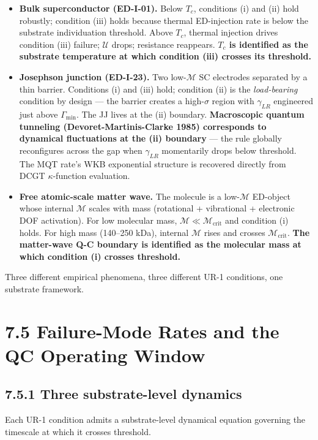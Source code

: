 \documentclass[11pt]{book}
\begin{document}
\begin{itemize}
\item \textbf{Bulk superconductor (ED-I-01).} Below $T_c$, conditions (i) and (ii) hold robustly; condition (iii) holds because thermal ED-injection rate is below the substrate individuation threshold. Above $T_c$, thermal injection drives condition (iii) failure; $\mathcal{U}$ drops; resistance reappears. \textbf{$T_c$ is identified as the substrate temperature at which condition (iii) crosses its threshold.}
\item \textbf{Josephson junction (ED-I-23).} Two low-$\mathcal{M}$ SC electrodes separated by a thin barrier. Conditions (i) and (iii) hold; condition (ii) is the \textit{load-bearing} condition by design — the barrier creates a high-$\sigma$ region with $\gamma_{LR}$ engineered just above $\Gamma_\mathrm{min}$. The JJ lives at the (ii) boundary. \textbf{Macroscopic quantum tunneling (Devoret-Martinis-Clarke 1985) corresponds to dynamical fluctuations at the (ii) boundary} — the rule globally reconfigures across the gap when $\gamma_{LR}$ momentarily drops below threshold. The MQT rate's WKB exponential structure is recovered directly from DCGT $\kappa$-function evaluation.
\item \textbf{Free atomic-scale matter wave.} The molecule is a low-$\mathcal{M}$ ED-object whose internal $\mathcal{M}$ scales with mass (rotational + vibrational + electronic DOF activation). For low molecular mass, $\mathcal{M} \ll \mathcal{M}_\mathrm{crit}$ and condition (i) holds. For high mass (140–250 kDa), internal $\mathcal{M}$ rises and crosses $\mathcal{M}_\mathrm{crit}$. \textbf{The matter-wave Q-C boundary is identified as the molecular mass at which condition (i) crosses threshold.}
\end{itemize}

Three different empirical phenomena, three different UR-1 conditions, one substrate framework.

\section{7.5 Failure-Mode Rates and the QC Operating Window}

\subsection{7.5.1 Three substrate-level dynamics}

Each UR-1 condition admits a substrate-level dynamical equation governing the timescale at which it crosses threshold.
\end{document}
